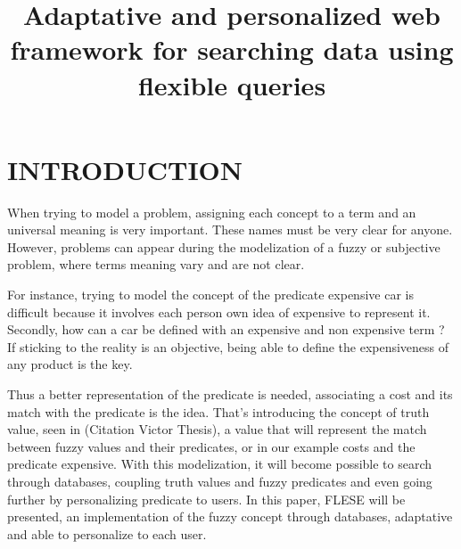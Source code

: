 \documentclass[a4paper,twoside]{article}
\begin{document}
\title{Adaptative and personalized web framework for searching data using flexible queries  \subtitle{} }

\author{
}



\onecolumn \maketitle \normalsize \vfill

\section{\uppercase{Introduction}}
\label{sec:introduction}

\noindent When trying to model a problem, assigning each concept to a term and an universal meaning is very important. These names must be very clear for anyone. However, problems can appear during the modelization of a fuzzy or subjective problem, where terms meaning vary and are not clear. 

\noindent For instance, trying to model the concept of the predicate expensive car is difficult because it involves each person own idea of expensive to represent it.  Secondly, how can a car be defined with an expensive and non expensive term ? If sticking to the reality is an objective, being able to define the expensiveness of any product is the key.

\noindent Thus a better representation of the predicate is needed, associating a cost and its match with the predicate is the idea. That's introducing the concept of truth value, seen in (Citation Victor Thesis), a value that will represent the match between fuzzy values and their predicates, or in our example costs and the predicate expensive. With this modelization, it will become possible to search through databases, coupling truth values and fuzzy predicates and even going further by personalizing predicate to users.
In this paper, FLESE will be presented, an implementation of the fuzzy concept through databases, adaptative and able to personalize to each user.
\end{document}

